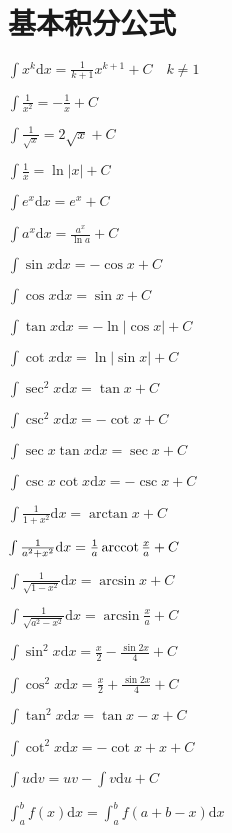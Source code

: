 \section{基本积分公式}

\begin{multicols}{2}
    \begin{spacing}{\hangju}
        \noindent $\int{x^k}\mathrm{d}x = \frac{1}{k+1}x^{k+1} + C \quad k\neq1$

        \noindent $\int{\frac{1}{x^2}} = -\frac{1}{x} + C$

        \noindent $\int{\frac{1}{\sqrt{x}}} = 2\sqrt{x} + C$

        \noindent $\int{\frac{1}{x}} = \ln{\left| x \right|} + C$

        \noindent $\int{e^x}\mathrm{d}x = e^x + C$

        \noindent $\int{a^x}\mathrm{d}x = \frac{a^x}{\ln{a}} + C$

        \noindent $\int{\sin{x}}\mathrm{d}x = -\cos{x} + C$

        \noindent $\int{\cos{x}}\mathrm{d}x = \sin{x} + C$

        \noindent $\int{\tan{x}}\mathrm{d}x = -\ln{\left| \cos{x} \right|} + C$

        \noindent $\int{\cot{x}}\mathrm{d}x = \ln{\left| \sin{x} \right|} + C$

        \noindent $\int{\sec^2{x}}\mathrm{d}x = \tan{x} + C$

        \noindent $\int{\csc^2{x}}\mathrm{d}x = -\cot{x} + C$

        \noindent $\int{\sec{x}\tan{x}}\mathrm{d}x = \sec{x} + C$

        \noindent $\int{\csc{x}\cot{x}}\mathrm{d}x = -\csc{x} + C$

        \noindent $\int{\frac{1}{1 + x^2}}\mathrm{d}x = \arctan{x} + C$

        \noindent $\int{\frac{1}{a^2 + x^2}}\mathrm{d}x = \frac{1}{a}\operatorname{arccot}{\frac{x}{a}} + C$

        \noindent $\int{\frac{1}{\sqrt{1 - x^2}}}\mathrm{d}x = \arcsin{x} + C$

        \noindent $\int{\frac{1}{\sqrt{a^2 - x^2}}}\mathrm{d}x = \arcsin{\frac{x}{a}} + C$

        \noindent $\int{\sin^2{x}}\mathrm{d}x = \frac{x}{2} - \frac{\sin{2x}}{4} + C$

        \noindent $\int{\cos^2{x}}\mathrm{d}x = \frac{x}{2} + \frac{\sin{2x}}{4} + C$

        \noindent $\int{\tan^2{x}}\mathrm{d}x = \tan{x} - x + C$

        \noindent $\int{\cot^2{x}}\mathrm{d}x = - \cot{x} + x + C$

        \noindent $\int{u}\mathrm{d}v = uv - \int{v}\mathrm{d}u + C$

        \noindent $\int_{a}^{b}{f(x)}\mathrm{d}x = \int_{a}^{b}{f(a + b - x)}\mathrm{d}x$
    \end{spacing}
\end{multicols}

